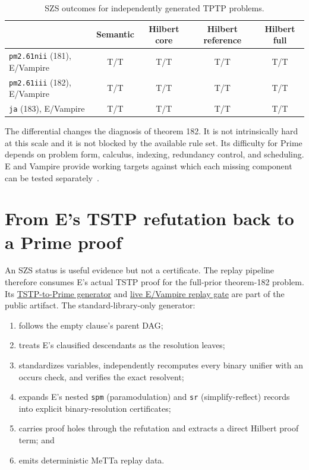 \documentclass[10pt]{article}
\begin{document}
\begin{table}[ht]
\centering
\begin{tabular}{@{}lcccc@{}}
\toprule
 & Semantic & Hilbert core & Hilbert reference & Hilbert full\\
\midrule
\texttt{pm2.61nii} (181), E/Vampire & T/T & T/T & T/T & T/T\\
\texttt{pm2.61iii} (182), E/Vampire & T/T & T/T & T/T & T/T\\
\texttt{ja} (183), E/Vampire & T/T & T/T & T/T & T/T\\
\bottomrule
\end{tabular}
\caption{SZS outcomes for independently generated TPTP problems.}
\label{tab:external}
\end{table}

The differential changes the diagnosis of theorem 182.  It is not intrinsically
hard at this scale and it is not blocked by the available rule set.  Its
difficulty for Prime depends on problem form, calculus, indexing, redundancy
control, and scheduling.  E and Vampire provide working targets against which
each missing component can be tested separately~\cite{eprover,vampire}.

\section{From E's TSTP refutation back to a Prime proof}

An SZS status is useful evidence but not a certificate.  The replay pipeline
therefore consumes E's actual TSTP proof for the full-prior theorem-182 problem.
Its
\href{https://github.com/zariuq/MeTTapedia/blob/prime-atp-pcxp-20260718/MettaKernel/kernel/pcxp_trace_certification/setmm_prime_e_frontier_tstp_replay_tools.py}
{TSTP-to-Prime generator} and
\href{https://github.com/zariuq/MeTTapedia/blob/prime-atp-pcxp-20260718/MettaKernel/kernel/pcxp_trace_certification/run_setmm_prime_external_tstp_replay_v0_gate.sh}
{live E/Vampire replay gate} are part of the public artifact.
The standard-library-only generator:

\begin{enumerate}
\item follows the empty clause's parent DAG;
\item treats E's clausified descendants as the resolution leaves;
\item standardizes variables, independently recomputes every binary unifier
  with an occurs check, and verifies the exact resolvent;
\item expands E's nested \texttt{spm} (paramodulation) and \texttt{sr}
  (simplify-reflect) records into explicit binary-resolution certificates;
\item carries proof holes through the refutation and extracts a direct Hilbert
  proof term; and
\item emits deterministic MeTTa replay data.
\end{enumerate}
\end{document}
